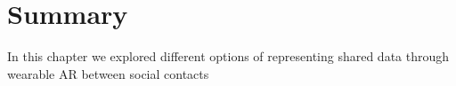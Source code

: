 \section{Summary}

In this chapter we explored different options of representing shared data through wearable AR between social contacts

